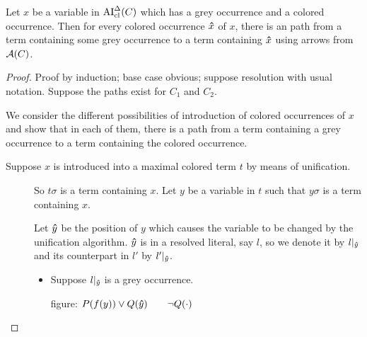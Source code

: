 \documentclass[,%
	paper=a4,%
	DIV11, %
	twoside=false,%
	liststotoc,
	bibtotoc,
	draft=false,%
	numbers=noendperiod
]{scrartcl}
\begin{document}
\begin{clemma}
	Let $x$ be a variable in $\operatorname{AI}_\mathrm{cl}^\Delta(C)$ which has a grey occurrence and a colored occurrence.
	Then for every colored occurrence $\bm\hat x$ of $x$, there is an path from a term containing some grey occurrence to a term containing $\bm\hat x$ using arrows from $\operatorname{\mathcal{A}}(C)$.
\end{clemma}
\begin{proof}
	\newcommand{\one}{\circled{1}}
	\newcommand{\two}{\circled{2}}
	Proof by induction; base case obvious; suppose resolution with usual notation.
	Suppose the paths exist for $C_1$ and $C_2$.

	We consider the different possibilities of introduction of colored occurrences of $x$ and show that in each of them, there is a path from a term containing a grey occurrence to a term containing the colored occurrence.

	\begin{description}
		\item[Suppose $x$ is introduced into a maximal colored term $t$ by means of unification.]
			So $t\sigma$ is a term containing $x$.
			Let $y$ be a variable in $t$ such that $y\sigma$ is a term containing $x$.

			Let $\bm\hat y$ be the position of $y$ which causes the variable to be changed by the unification algorithm.
			$\bm\hat y$ is in a resolved literal, say $l$, so we denote it by $l|_{\bm\hat y}$ and its counterpart in $l'$ by $l'|_{\bm\hat y}$. 

			\begin{itemize}
				\item Suppose $l|_{\bm\hat y}$ is a grey occurrence.

					figure: $P(f(y)) \lor Q(\bm\hat y)\quad\quad\lnot Q(\cdot)$


\end{itemize}
\end{description}
\end{proof}
\end{document}
